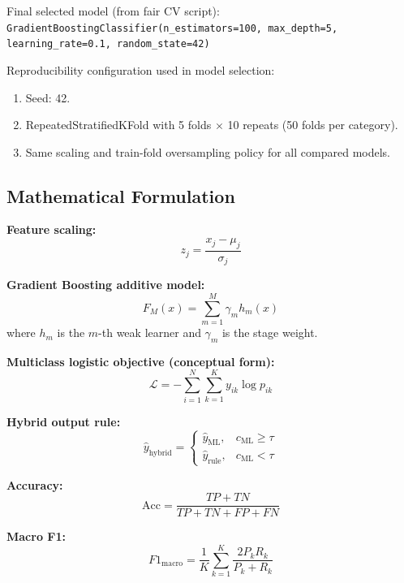 \documentclass[10pt,twocolumn,letterpaper]{IEEEtran}
\begin{document}
Final selected model (from fair CV script): \texttt{GradientBoostingClassifier(n\_estimators=100, max\_depth=5, learning\_rate=0.1, random\_state=42)}

Reproducibility configuration used in model selection:
\begin{enumerate}
\item Seed: 42.
\item RepeatedStratifiedKFold with 5 folds $\times$ 10 repeats (50 folds per category).
\item Same scaling and train-fold oversampling policy for all compared models.
\end{enumerate}

\subsection{Mathematical Formulation}

\textbf{Feature scaling:}
\begin{equation}
z_j = \frac{x_j - \mu_j}{\sigma_j}
\end{equation}

\textbf{Gradient Boosting additive model:}
\begin{equation}
F_M(x) = \sum_{m=1}^{M} \gamma_m h_m(x)
\end{equation}
where $h_m$ is the $m$-th weak learner and $\gamma_m$ is the stage weight.

\textbf{Multiclass logistic objective (conceptual form):}
\begin{equation}
\mathcal{L} = -\sum_{i=1}^{N}\sum_{k=1}^{K} y_{ik} \log p_{ik}
\end{equation}

\textbf{Hybrid output rule:}
\begin{equation}
\hat{y}_{\text{hybrid}} =
\begin{cases}
\hat{y}_{\text{ML}}, & c_{\text{ML}} \geq \tau \\
\hat{y}_{\text{rule}}, & c_{\text{ML}} < \tau
\end{cases}
\end{equation}

\textbf{Accuracy:}
\begin{equation}
\mathrm{Acc} = \frac{TP+TN}{TP+TN+FP+FN}
\end{equation}

\textbf{Macro F1:}
\begin{equation}
F1_{\text{macro}} = \frac{1}{K}\sum_{k=1}^{K} \frac{2P_kR_k}{P_k+R_k}
\end{equation}
\end{document}
